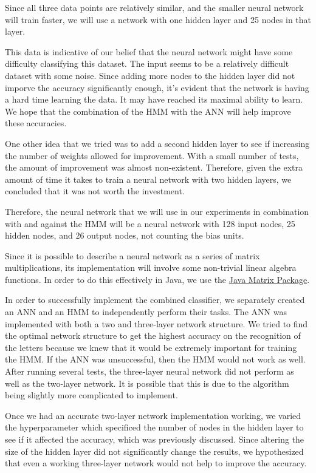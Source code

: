 \documentclass[11pt,letterpaper]{article}
\begin{document}
Since all three data points are relatively similar, and the smaller neural
network will train faster, we will use a network with one hidden layer and 25 nodes
in that layer.

This data is indicative of our belief that the neural network might have some
difficulty classifying this dataset. The input seems to be a relatively
difficult dataset with some noise. Since adding more nodes to the hidden layer
did not imporve the accuracy significantly enough, it's evident that the
network is having a hard time learning the data. It may have reached its
maximal ability to learn. We hope that the combination of the HMM with the ANN
will help improve these accuracies.

One other idea that we tried was to add a second hidden layer to see if
increasing the number of weights allowed for improvement. With a small number
of tests, the amount of improvement was almost non-existent. Therefore, given
the extra amount of time it takes to train a neural network with two hidden
layers, we concluded that it was not worth the investment.

Therefore, the neural network that we will use in our experiments in
combination with and against the HMM will be a neural network with 128 input
nodes, 25 hidden nodes, and 26 output nodes, not counting the bias units.

Since it is possible to describe a neural network as a series of matrix multiplications, its
implementation will involve some non-trivial linear algebra functions. In order to do this
effectively in Java, we use the \href{http://math.nist.gov/javanumerics/jama/}{Java Matrix Package}.

In order to successfully implement the combined classifier, we separately
created an ANN and an HMM to independently perform their tasks. The ANN was
implemented with both a two and three-layer network structure. We tried to
find the optimal network structure to get the highest accuracy on the
recognition of the letters because we knew that it would be extremely important
for training the HMM\@. If the ANN was unsuccessful, then the HMM would not work
as well. After running several tests, the three-layer neural network did not
perform as well as the two-layer network. It is possible that this is due to
the algorithm being slightly more complicated to implement.

Once we had an accurate two-layer network implementation working, we varied the
hyperparameter which specificed the number of nodes in the hidden layer to see
if it affected the accuracy, which was previously discussed. Since altering the
size of the hidden layer did not significantly change the results, we
hypothesized that even a working three-layer network would not help to improve
the accuracy.
\end{document}
